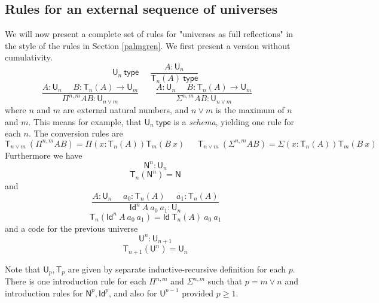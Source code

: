 \documentclass[11pt,a4paper]{article}
\newcommand{\Id}{\mathsf{Id}}
\def\NN{\mathsf{N}}
\def\UU{\mathsf{U}}
\newcommand{\type}{\mathsf{type}}
\newcommand{\T}{\mathsf{T}}
\begin{document}
\subsection*{Rules for an external sequence of universes}

We will now present a complete set of rules for "universes as full reflections" in the style of the rules in Section \ref{palmgren}. We first present a version without cumulativity.
$$
\UU_n~\type~~~~~~
\frac{A:\UU_{n}}{\T_{n}(A)~\type}
$$
$$
\frac{A:\UU_{n}~~~~~~B:\T_{n}(A)\rightarrow \UU_{m}}
     {\Pi^{n,m} A B:\UU_{n\vee m}}~~~~~~~~~
\frac{A:\UU_{n}~~~~~~B:\T_{n}(A)\rightarrow \UU_{m}}
     {\Sigma^{n,m} A B:\UU_{n\vee m}}~~~~~~~~~
$$
where $n$ and $m$ are external natural numbers, and $n \vee m$ is the maximum of $n$ and $m$. This means for example, that $\UU_n~\type$ is a {\em schema}, yielding one rule for each $n$.
The conversion rules are
$$
\T_{n\vee m}~(\Pi^{n,m} A B) = \Pi (x:\T_{n}(A)) \T_{m}(B~x)~~~~~~~
\T_{n\vee m}~(\Sigma^{n,m} A B) = \Sigma (x:\T_{n}(A)) \T_{m}(B~x)~~~~~~~
$$
Furthermore we have $$\NN^{n}:\UU_{n}$$
$$\T_{n}(\NN^{n}) = \NN$$
and
$$
\frac{A:\UU_n~~~~~~a_0:\T_n(A)~~~~~~a_1:\T_n(A)}
{\Id^n~A~a_0~a_1:\UU_n}
$$
$$\T_n(\Id^n~A~a_0~a_1) = \Id~\T_n(A)~a_0~a_1$$
and a code for the previous universe
$${\UU^{n}}:\UU_{n + 1}$$
$$\T_{n + 1}({\UU^{n}}) = \UU_{n}$$

Note that $\UU_p, \T_p$ are given by separate inductive-recursive definition for each $p$. There is one introduction rule for each $\Pi^{n,m}$ and $\Sigma^{n,m}$ such that $p = m \vee n$ and introduction rules for $\NN^p, \Id^p$, and also for $\UU^{p-1}$ provided $p \geq 1$.
%
%
%
%
\end{document}
